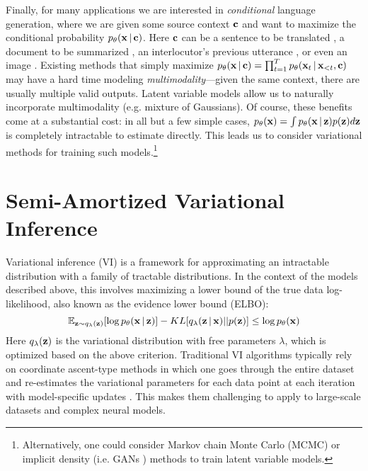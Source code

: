 \documentclass{article}
\begin{document}
Finally, for many applications we are interested in \emph{conditional} language 
generation, where we are given some source
context $\mathbf{c}$ and want to maximize the conditional probability $p_{\theta}(\mathbf{x} \,|\, \mathbf{c})$. Here $\mathbf{c}$ can be a sentence to be translated \cite{Sutskever2014,Cho2014}, a document to be summarized \cite{Rush2015}, an interlocutor's previous utterance \cite{Li2016}, or even an image \cite{Vinyals2015b}. Existing methods that simply maximize 
$p_\theta(\mathbf{x} \,|\, \mathbf{c} ) = \prod_{t=1}^T p_\theta(\mathbf{x}_t \,|\, \mathbf{x}_{<t}, \mathbf{c})$ may have a hard time modeling \emph{multimodality}---given the same context, there are usually multiple valid outputs. Latent variable models allow us to naturally incorporate multimodality (e.g. mixture of Gaussians). Of course, these benefits come at a substantial cost: in all but a few simple cases, $p_\theta(\mathbf{x}) = \int p_\theta(\mathbf{x} \,|\, \mathbf{z}) p(\mathbf{z}) d\mathbf{z}$ is completely intractable to estimate directly. 
This leads us to consider variational methods for training
such models.\footnote{Alternatively, one could consider Markov chain
Monte Carlo (MCMC) or implicit density 
(i.e. GANs \cite{goodfellow2014generative}) methods
to train latent variable models.}
\vspace{-4mm}
\section{Semi-Amortized Variational Inference}
\vspace{-4mm}
Variational inference (VI) \cite{Jordan1999} is a framework 
for approximating an intractable distribution with a family of tractable 
distributions. In the context of the models described above, this involves
maximizing a lower bound of the true data log-likelihood, also known as the evidence lower bound (ELBO):
\[ \mathbb{E}_{\mathbf{z} \sim q_\lambda(\mathbf{z})} [\log p_\theta(\mathbf{x} \,|\, \mathbf{z})] - 
KL[q_{\lambda} (\mathbf{z} \,|\, \mathbf{x}) || p(\mathbf{z})] \le \log p_{\theta}(\mathbf{x}) \] 
Here $q_\lambda(\mathbf{z})$ is the variational distribution with free parameters $\lambda$, which is optimized based on the above criterion.
Traditional VI algorithms typically rely on coordinate ascent-type methods in which one goes through the entire dataset and re-estimates the variational parameters for each data point at each iteration with model-specific updates \cite{Ghahramani2001}. This makes them challenging to apply to large-scale datasets and complex neural models.
\end{document}
